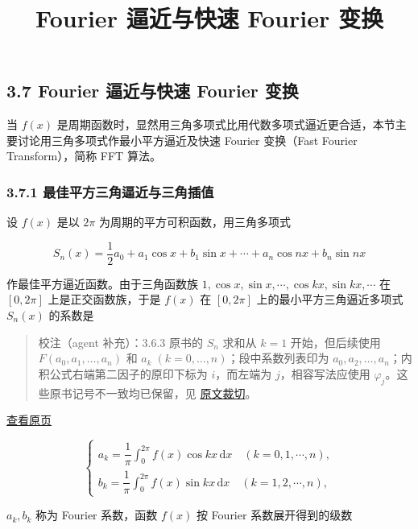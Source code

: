 \documentclass[
  10pt,
  fontset=fandol]{ctexart}
\title{Fourier 逼近与快速 Fourier 变换}
\author{}
\date{}
\begin{document}
\maketitle

\subsection{3.7 Fourier 逼近与快速 Fourier 变换}\label{fourier-ux903cux8fd1ux4e0eux5febux901f-fourier-ux53d8ux6362}

当 \(f(x)\) 是周期函数时，显然用三角多项式比用代数多项式逼近更合适，本节主要讨论用三角多项式作最小平方逼近及快速 Fourier 变换（Fast Fourier Transform），简称 FFT 算法。

\subsubsection{3.7.1 最佳平方三角逼近与三角插值}\label{ux6700ux4f73ux5e73ux65b9ux4e09ux89d2ux903cux8fd1ux4e0eux4e09ux89d2ux63d2ux503c}

设 \(f(x)\) 是以 \(2\pi\) 为周期的平方可积函数，用三角多项式

\[
S_n(x)=\frac12a_0+a_1\cos x+b_1\sin x+\cdots+a_n\cos nx+b_n\sin nx\tag{3.7.1}
\]

作最佳平方逼近函数。由于三角函数族 \(1,\allowbreak \cos x,\allowbreak \sin x,\allowbreak \cdots,\allowbreak \cos kx,\allowbreak \sin kx,\allowbreak \cdots\) 在 \([0,2\pi]\) 上是正交函数族，于是 \(f(x)\) 在 \([0,2\pi]\) 上的最小平方三角逼近多项式 \(S_n(x)\) 的系数是

\begin{quote}
校注（agent 补充）：3.6.3 原书的 \(S_n\) 求和从 \(k=1\) 开始，但后续使用 \(F(a_0,a_1,\ldots,a_n)\) 和 \(a_k\;(k=0,\ldots,n)\)；段中系数列表印为 \(a_0,a_2,\ldots,a_n\)；内积公式右端第二因子的原印下标为 \(i\)，而左端为 \(j\)，相容写法应使用 \(\varphi_j\)。这些原书记号不一致均已保留，见 \href{../assets/ch03b/p084-multivariate-formulas.png}{原文裁切}。
\end{quote}

\href{../../source-images/pdf-085.jpeg}{查看原页}

\[
\begin{cases}
a_k=\dfrac1\pi\displaystyle\int_0^{2\pi}f(x)\cos kx\,\mathrm dx\quad(k=0,1,\cdots,n),\\[4pt]
b_k=\dfrac1\pi\displaystyle\int_0^{2\pi}f(x)\sin kx\,\mathrm dx\quad(k=1,2,\cdots,n),
\end{cases}\tag{3.7.2}
\]

\(a_k,b_k\) 称为 Fourier 系数，函数 \(f(x)\) 按 Fourier 系数展开得到的级数
\end{document}
